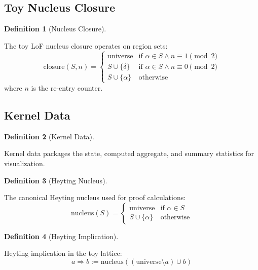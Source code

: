\documentclass{amsart}
\theoremstyle{definition}
\newtheorem{definition}{Definition}[section]
\theoremstyle{remark}
\begin{document}
\subsection{Toy Nucleus Closure}
\label{sec:toy-nucleus}

\begin{definition}[Nucleus Closure]
\label{def:nucleus-closure}

The toy LoF nucleus closure operates on region sets:
\[
\text{closure}(S, n) = \begin{cases}
\text{universe} & \text{if } \alpha \in S \land n \equiv 1 \pmod{2} \\
S \cup \{\delta\} & \text{if } \alpha \in S \land n \equiv 0 \pmod{2} \\
S \cup \{\alpha\} & \text{otherwise}
\end{cases}
\]
where $n$ is the re-entry counter.
\end{definition}

\subsection{Kernel Data}
\label{sec:kernel-data}

\begin{definition}[Kernel Data]
\label{def:kernel-data}

Kernel data packages the state, computed aggregate, and summary statistics for visualization.
\end{definition}

\begin{definition}[Heyting Nucleus]
\label{def:heyting-nucleus}
\uses{}

The canonical Heyting nucleus used for proof calculations:
\[
\text{nucleus}(S) = \begin{cases}
\text{universe} & \text{if } \alpha \in S \\
S \cup \{\alpha\} & \text{otherwise}
\end{cases}
\]
\end{definition}

\begin{definition}[Heyting Implication]
\label{def:heyting-impl}

Heyting implication in the toy lattice:
\[
a \Rightarrow b := \text{nucleus}((\text{universe} \setminus a) \cup b)
\]
\end{definition}
\end{document}
